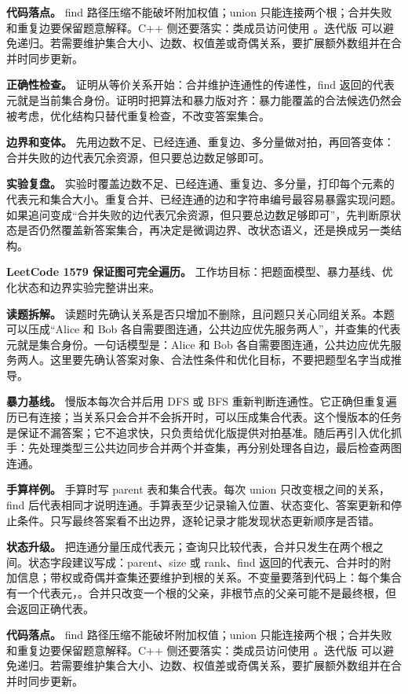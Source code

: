 \textbf{代码落点。} find 路径压缩不能破坏附加权值；union 只能连接两个根；合并失败和重复边要保留题意解释。C++ 侧还要落实：类成员访问使用 。迭代版  可以避免递归。若需要维护集合大小、边数、权值差或奇偶关系，要扩展额外数组并在合并时同步更新。

\textbf{正确性检查。} 证明从等价关系开始：合并维护连通性的传递性，find 返回的代表元就是当前集合身份。证明时把算法和暴力版对齐：暴力能覆盖的合法候选仍然会被考虑，优化结构只替代重复检查，不改变答案集合。

\textbf{边界和变体。} 先用边数不足、已经连通、重复边、多分量做对拍，再回答变体：合并失败的边代表冗余资源，但只要总边数足够即可。

\textbf{实验复盘。} 实验时覆盖边数不足、已经连通、重复边、多分量，打印每个元素的代表元和集合大小。重复合并、已经连通的边和字符串编号最容易暴露实现问题。如果追问变成“合并失败的边代表冗余资源，但只要总边数足够即可”，先判断原状态是否仍然覆盖新答案集合，再决定是微调边界、改状态语义，还是换成另一类结构。

\noindent\textbf{LeetCode 1579 保证图可完全遍历。} 工作坊目标：把题面模型、暴力基线、优化状态和边界实验完整讲出来。

\textbf{读题拆解。} 读题时先确认关系是否只增加不删除，且问题只关心同组关系。本题可以压成“Alice 和 Bob 各自需要图连通，公共边应优先服务两人”，并查集的代表元就是集合身份。一句话模型是：Alice 和 Bob 各自需要图连通，公共边应优先服务两人。这里要先确认答案对象、合法性条件和优化目标，不要把题型名字当成推导。

\textbf{暴力基线。} 慢版本每次合并后用 DFS 或 BFS 重新判断连通性。它正确但重复遍历已有连接；当关系只会合并不会拆开时，可以压成集合代表。这个慢版本的任务是保证不漏答案；它不追求快，只负责给优化版提供对拍基准。随后再引入优化抓手：先处理类型三公共边同步合并两个并查集，再分别处理各自边，最后检查两图连通。

\textbf{手算样例。} 手算时写 parent 表和集合代表。每次 union 只改变根之间的关系，find 后代表相同才说明连通。手算表至少记录输入位置、状态变化、答案更新和停止条件。只写最终答案看不出边界，逐轮记录才能发现状态更新顺序是否错。

\textbf{状态升级。} 把连通分量压成代表元；查询只比较代表，合并只发生在两个根之间。状态字段建议写成：parent、size 或 rank、find 返回的代表元、合并时的附加信息；带权或奇偶并查集还要维护到根的关系。不变量要落到代码上：每个集合有一个代表元，。合并只改变一个根的父亲，非根节点的父亲可能不是最终根，但  会返回正确代表。

\textbf{代码落点。} find 路径压缩不能破坏附加权值；union 只能连接两个根；合并失败和重复边要保留题意解释。C++ 侧还要落实：类成员访问使用 。迭代版  可以避免递归。若需要维护集合大小、边数、权值差或奇偶关系，要扩展额外数组并在合并时同步更新。

